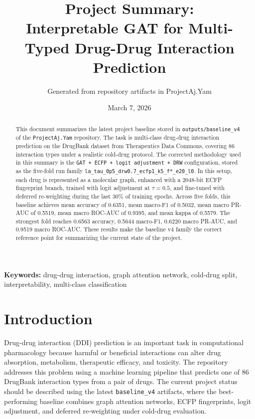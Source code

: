 \documentclass[12pt,a4paper]{report}
\title{Project Summary:\\Interpretable GAT for Multi-Typed Drug-Drug Interaction Prediction}
\author{Generated from repository artifacts in ProjectAj.Yam}
\date{March 7, 2026}
\begin{document}
\maketitle
{}

\begin{abstract}
This document summarizes the latest project baseline stored in \texttt{outputs/baseline\_v4} of the \texttt{ProjectAj.Yam} repository. The task is multi-class drug-drug interaction prediction on the DrugBank dataset from Therapeutics Data Commons, covering 86 interaction types under a realistic cold-drug protocol. The corrected methodology used in this summary is the \texttt{GAT + ECFP + logit adjustment + DRW} configuration, stored as the five-fold run family \texttt{la\_tau\_0p5\_drw0.7\_ecfp1\_k5\_f*\_e20\_l0}. In this setup, each drug is represented as a molecular graph, enhanced with a 2048-bit ECFP fingerprint branch, trained with logit adjustment at \(\tau = 0.5\), and fine-tuned with deferred re-weighting during the last 30\% of training epochs. Across five folds, this baseline achieves mean accuracy of 0.6351, mean macro-F1 of 0.5032, mean macro PR-AUC of 0.5519, mean macro ROC-AUC of 0.9395, and mean kappa of 0.5579. The strongest fold reaches 0.6563 accuracy, 0.5644 macro-F1, 0.6220 macro PR-AUC, and 0.9519 macro ROC-AUC. These results make the baseline v4 family the correct reference point for summarizing the current state of the project.
\end{abstract}

\noindent\textbf{Keywords:} drug-drug interaction, graph attention network, cold-drug split, interpretability, multi-class classification

\tableofcontents
\clearpage
{}

\chapter{Introduction}
Drug-drug interaction (DDI) prediction is an important task in computational pharmacology because harmful or beneficial interactions can alter drug absorption, metabolism, therapeutic efficacy, and toxicity. The repository addresses this problem using a machine learning pipeline that predicts one of 86 DrugBank interaction types from a pair of drugs. The current project status should be described using the latest \texttt{baseline\_v4} artifacts, where the best-performing baseline combines graph attention networks, ECFP fingerprints, logit adjustment, and deferred re-weighting under cold-drug evaluation.
\end{document}
